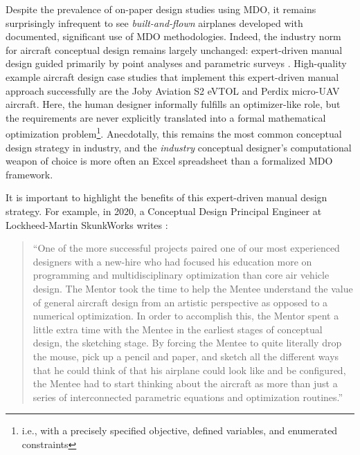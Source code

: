 

Despite the prevalence of on-paper design studies using MDO, it remains surprisingly infrequent to see \textit{built-and-flown} airplanes developed with documented, significant use of MDO methodologies. Indeed, the industry norm for aircraft conceptual design remains largely unchanged: expert-driven manual design guided primarily by point analyses and parametric surveys \cite{gudmundsson_general_2014, nicolai_fundamentals_2010, walton_cd_2020}. High-quality example aircraft design case studies that implement this expert-driven manual approach successfully are the Joby Aviation S2 eVTOL \cite{stoll_conceptual_2014} and Perdix micro-UAV \cite{tao_design_2012} aircraft. Here, the human designer informally fulfills an optimizer-like role, but the requirements are never explicitly translated into a formal mathematical optimization problem\footnote{i.e., with a precisely specified objective, defined variables, and enumerated constraints}. Anecdotally, this remains the most common conceptual design strategy in industry, and the \textit{industry} conceptual designer's computational weapon of choice is more often an Excel spreadsheet than a formalized MDO framework.

It is important to highlight the benefits of this expert-driven manual design strategy. For example, in 2020, a Conceptual Design Principal Engineer at Lockheed-Martin SkunkWorks writes \cite{walton_cd_2020}:

\begin{quote}
    ``One of the more successful projects paired one of our most experienced designers with a new-hire who had focused his education more on programming and multidisciplinary optimization than core air vehicle design. The Mentor took the time to help the Mentee understand the value of general aircraft design from an artistic perspective as opposed to a numerical optimization. In order to accomplish this, the Mentor spent a little extra time with the Mentee in the earliest stages of conceptual design, the sketching stage. By forcing the Mentee to quite literally drop the mouse, pick up a pencil and paper, and sketch all the different ways that he could think of that his airplane could look like and be configured, the Mentee had to start thinking about the aircraft as more than just a series of interconnected parametric equations and optimization routines.''
\end{quote}

